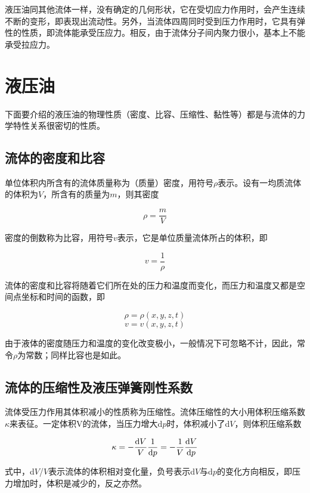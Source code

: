 液压油同其他流体一样，没有确定的几何形状，它在受切应力作用时，会产生连续不断的变形，即表现出流动性。另外，当流体四周同时受到压力作用时，它具有弹性的性质，即流体能承受压应力。相反，由于流体分子间内聚力很小，基本上不能承受拉应力。

\section{液压油}

下面要介绍的液压油的物理性质（密度、比容、压缩性、黏性等）都是与流体的力学特性关系很密切的性质。

\subsection{流体的密度和比容}

单位体积内所含有的流体质量称为（质量）密度，用符号$\rho $表示。设有一均质流体的体积为$\mathit{V}$，所含有的质量为$\mathit{m}$，则其密度

\begin{equation}
    \rho =\frac{m}{V}
\end{equation}

密度的倒数称为比容，用符号$\mathit{v}$表示，它是单位质量流体所占的体积，即

\begin{equation}
    v=\frac{1}{\rho }
\end{equation}

流体的密度和比容将随着它们所在处的压力和温度而变化，而压力和温度又都是空间点坐标和时间的函数，即

$$\rho =\rho (x,y,z,t) $$
$$v=v(x,y,z,t) $$

由于液体的密度随压力和温度的变化改变极小，一般情况下可忽略不计，因此，常令$\rho $为常数；同样比容也是如此。

\subsection{流体的压缩性及液压弹簧刚性系数}

流体受压力作用其体积减小的性质称为压缩性。流体压缩性的大小用体积压缩系数$\kappa $来表征。一定体积V的流体，当压力增大d$\mathit{p}$时，体积减小了d$\mathit{V}$，则体积压缩系数

\begin{equation}
    \kappa =-\frac{{\rm d}V}{V}\frac{1}{{\rm d}p}=-\frac{1}{V}\frac{{\rm d}V}{{\rm d}p}
\end{equation}

式中，d$\mathit{V}$/$\mathit{V}$表示流体的体积相对变化量，负号表示d$\mathit{V}$与d$\mathit{p}$的变化方向相反，即压力增加时，体积是减少的，反之亦然。

